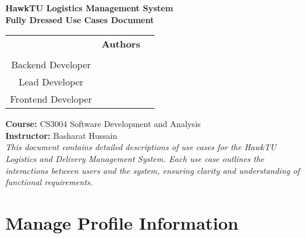 \documentclass{article}
\begin{document}
\begin{titlepage}
    \centering
    {\Large \textbf{HawkTU Logistics Management System}} \\[8cm]
    
    {\huge \textbf{Fully Dressed Use Cases Document}} \\[6cm]

    \begin{tabular}{c c c}
    & {\Large \textbf{Authors}} & \\[0.5cm]
    \begin{minipage}{0.3\textwidth}
        \centering
        {\large Danish Haroon} \\[0.5cm]
        {\large Backend Developer}
    \end{minipage} &
    \begin{minipage}{0.3\textwidth}
        \centering
        {\large Arqam} \\[0.5cm]
        {\large Lead Developer}
    \end{minipage} &
    \begin{minipage}{0.3\textwidth}
        \centering
        {\large Tabish Noman} \\[0.5cm]
        {\large Frontend Developer}
    \end{minipage} \\
    \end{tabular}

    \vspace*{90px}

    {\large \textbf{Course:} CS3004 Software Development and Analysis} \\[0.5cm]
    {\large \textbf{Instructor:} Basharat Hussain} \\[0.5cm]

    \vfill
    {\large \textit{This document contains detailed descriptions of use cases for the HawkTU Logistics and Delivery Management System. Each use case outlines the interactions between users and the system, ensuring clarity and understanding of functional requirements.}}
\end{titlepage}

\newpage

\centering\section*{Manage Profile Information}

\renewcommand{\arraystretch}{1.5}
\renewcommand\labelitemi{$\vcenter{\hbox{\tiny$\bullet$}}$}
\end{document}
